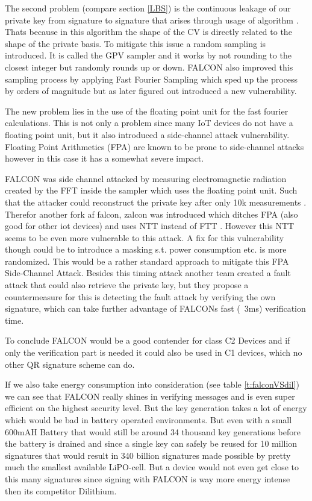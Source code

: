 \documentclass[conference]{IEEEtran}
\begin{document}
The second problem (compare section \ref{LBS}) is the continuous leakage of our private key from signature to signature that arises through usage of algorithm \label{alg:babel}. Thats because in this algorithm the shape of the CV is directly related to the shape of the private basis.
To mitigate this issue a random sampling is introduced. It is called the GPV sampler \cite{falcon_easyier_read} and it works by not rounding to the closest integer but randomly rounds up or down.
FALCON also improved this sampling process by applying Fast Fourier Sampling which sped up the process by orders of magnitude but as later figured out introduced a new vulnerability. 

The new problem lies in the use of the floating point unit for the fast fourier calculations. This is not only a problem since many IoT devices do not have a floating point unit, but it also introduced a side-channel attack vulnerability.
Floating Point Arithmetics (FPA) are known to be prone to side-channel attacks however in this case it has a somewhat severe impact.

FALCON was side channel attacked by measuring electromagnetic radiation created by the FFT inside the sampler which uses the floating point unit. Such that the attacker could reconstruct the private key after only 10k measurements \cite{falcon_side_channel}. Therefor another fork af falcon, zalcon was introduced which ditches FPA (also good for other iot devices) and uses NTT instead of FTT \cite{zalcon}. However this NTT seems to be even more vulnerable to this attack\cite{falcon_side_channel}. A fix for this vulnerability though could be to introduce a masking s.t. power consumption etc. is more randomized. This would be a rather standard approach to mitigate this FPA Side-Channel Attack.
Besides this timing attack another team \cite{bearz} created a fault attack that could also retrieve the private key, but they propose a countermeasure for this is detecting the fault attack by verifying the own signature, which can take further advantage of FALCONs fast (~3ms) verification time.

To conclude FALCON would be a good contender for class C2 Devices and if only the verification part is needed it could also be used in C1 devices, which no other QR signature scheme can do. 

If we also take energy consumption into consideration (see table \ref{t:falconVSdil}) we can see that FALCON really shines in verifying messages and is even super efficient on the highest security level. But the key generation takes a lot of energy which would be bad in battery operated environments. But even with a small 600mAH Battery that would still be around 34 thousand key generations before the battery is drained and since a single key can safely be reused for 10 million signatures that would result in 340 billion signatures made possible by pretty much the smallest available LiPO-cell. But a device would not even get close to this many signatures since signing with FALCON is way more energy intense then its competitor Dilithium.
\end{document}
